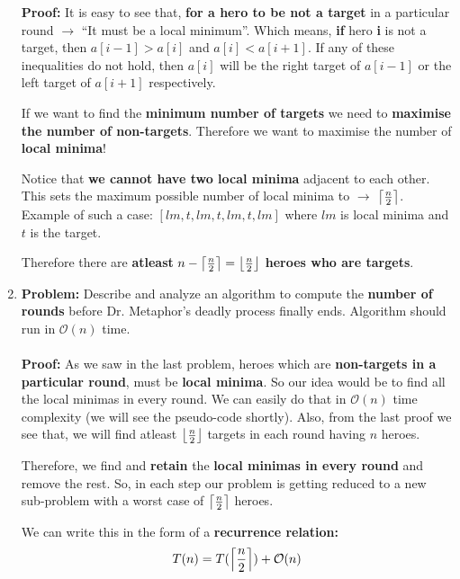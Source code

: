 \documentclass[11pt, fleqn]{article}
\DeclarePairedDelimiter\ceil{\lceil}{\rceil}
\DeclarePairedDelimiter\floor{\lfloor}{\rfloor}
\begin{document}
\begin{enumerate}
    \textbf{Proof: } It is easy to see that, \textbf{for a hero to be not a target} in a particular round $\longrightarrow$ ``It must be a local minimum''. Which means, \textbf{if} hero \textbf{i} is not a target, then $a[i-1] > a[i]$ and $a[i] < a[i+1]$. If any of these inequalities do not hold, then $a[i]$ will be the right target of $a[i-1]$ or the left target of $a[i+1]$ respectively.
    \medskip
    
    If we want to find the \textbf{minimum number of targets} we need to \textbf{maximise the number of non-targets}. Therefore we want to maximise the number of \textbf{local minima}!
    \medskip
    
    Notice that \textbf{we cannot have two local minima} adjacent to each other. This sets the maximum possible number of local minima to $\longrightarrow$ $\ceil*{\frac{n}{2}}$. Example of such a case: $[lm,t,lm,t,lm,t,lm]$ where $lm$ is local minima and $t$ is the target.
    \medskip
    
    Therefore there are \textbf{atleast} $n - \ceil*{\frac{n}{2}} = \floor*{\frac{n}{2}}$ \textbf{heroes who are targets}.
    
    \item \textbf{Problem: } Describe and analyze an algorithm to compute the \textbf{number of rounds} before Dr. Metaphor’s deadly process finally ends. Algorithm should run in $\mathcal{O}(n)$ time.
    \paragraph{}
    
    \textbf{Proof: } As we saw in the last problem, heroes which are \textbf{non-targets in a particular round}, must be \textbf{local minima}. So our idea would be to find all the local minimas in every round. We can easily do that in $\mathcal{O}(n)$ time complexity (we will see the pseudo-code shortly). Also, from the last proof we see that, we will find atleast $\floor*{\frac{n}{2}}$ targets in each round  having $n$ heroes.
    \medskip
    
    Therefore, we find and \textbf{retain} the \textbf{local minimas in every round} and remove the rest. So, in each step our problem is getting reduced to a new sub-problem with a worst case of $\ceil*{\frac{n}{2}}$ heroes.
    \medskip
    
    We can write this in the form of a \textbf{recurrence relation:}%
    \begin{equation*}
        T(n) = T(\ceil*{\frac{n}{2}}) + \mathcal{O}(n)
    \end{equation*}
    

\end{enumerate}
\end{document}
